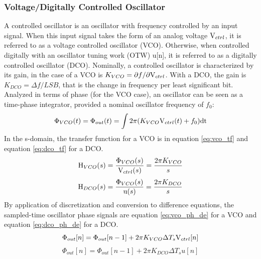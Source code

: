 		\subsubsection{Voltage/Digitally Controlled Oscillator}
			A controlled oscillator is an oscillator with frequency controlled by an input signal. When this input signal takes the form of an analog voltage $\textnormal{V}_{ctrl}$, it is referred to as a voltage controlled oscillator (VCO). Otherwise, when controlled digitally with an oscillator tuning work (OTW) u[n], it is referred to as a digitally controlled oscillator (DCO). Nominally, a controlled oscillator is characterized by its gain, in the case of a VCO is $K_{VCO} = \partial f/\partial \textnormal{V}_{ctrl}$. With a DCO, the gain is $K_{DCO} = \Delta f/LSB$, that is the change in frequency per least significant bit. Analyzed in terms of phase (for the VCO case), an oscillator can be seen as a time-phase integrator, provided a nominal oscillator frequency of $f_0$:
			\begin{equation}\label{eq:vco_ph}
				\Phi_{VCO}(t) = \Phi_{out}(t) = \int2\pi(K_{VCO}\textnormal{V}_{ctrl}(t) + f_0)\mathrm{dt}
			\end{equation}
			In the s-domain, the transfer function for a VCO is in equation \ref{eq:vco_tf} and equation \ref{eq:dco_tf} for a DCO. 
			\begin{equation}\label{eq:vco_tf}
				\mathrm{H}_{VCO}(s) = \frac{\Phi_{VCO}(s)}{\textnormal{V}_{ctrl}(s)} = \frac{2\pi K_{VCO}}{s}
			\end{equation}
			\begin{equation}\label{eq:dco_tf}
				\mathrm{H}_{DCO}(s) = \frac{\Phi_{VCO}(s)}{\textnormal{u}(s)} =  \frac{2\pi K_{DCO}}{s}
			\end{equation}
			By application of discretization and conversion to difference equations, the sampled-time oscillator phase signals are equation \ref{eq:vco_ph_de} for a VCO and equation \ref{eq:dco_ph_de} for a DCO. 
			\begin{equation}\label{eq:vco_ph_de}
				\Phi_{out}[n] = \Phi_{out}[n-1] + 2\pi K_{VCO}\Delta T_s\textnormal{V}_{ctrl}[n]
			\end{equation}
			\begin{equation}\label{eq:dco_ph_de}
				\Phi_{out}[n] = \Phi_{out}[n-1] + 2\pi K_{DCO}\Delta T_su[n]
			\end{equation}

